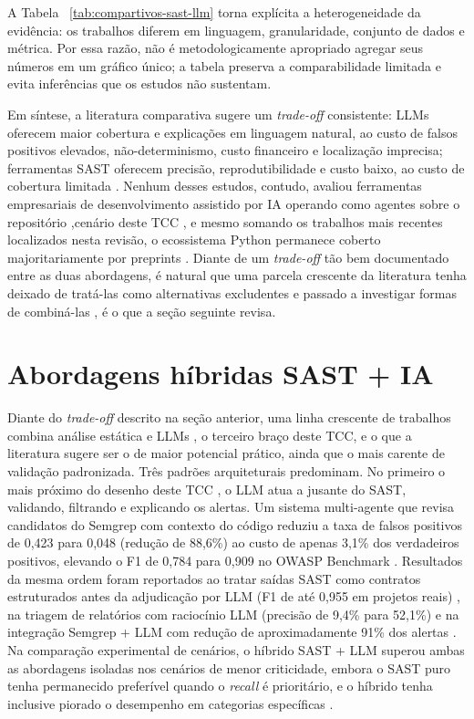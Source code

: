 A Tabela ~\ref{tab:compartivos-sast-llm} torna explícita a heterogeneidade da evidência: os trabalhos diferem em linguagem, granularidade, conjunto de dados e métrica. Por essa razão, não é metodologicamente apropriado agregar seus números em um gráfico único; a tabela preserva a comparabilidade limitada e evita inferências que os estudos não sustentam.

Em síntese, a literatura comparativa sugere um \textit{trade-off} consistente: LLMs oferecem maior cobertura e explicações em linguagem natural, ao custo de falsos positivos elevados, não-determinismo, custo financeiro e localização imprecisa; ferramentas SAST oferecem precisão, reprodutibilidade e custo baixo, ao custo de cobertura limitada \cite{Ozturk2023AIvsSAST, Tamberg2025LLMHarness, Gnieciak2025LLMvsSAST}. Nenhum desses estudos, contudo, avaliou ferramentas empresariais de desenvolvimento assistido por IA operando como agentes sobre o repositório ,cenário deste TCC , e mesmo somando os trabalhos mais recentes localizados nesta revisão, o ecossistema Python permanece coberto majoritariamente por preprints \cite{Pellew2026RealVuln, Farasat2025PythonSecurity, Zhou2024SASTLLMRepo, Adnan2026ALPHA}. Diante de um \textit{trade-off} tão bem documentado entre as duas abordagens, é natural que uma parcela crescente da literatura tenha deixado de tratá-las como alternativas excludentes e passado a investigar formas de combiná-las , é o que a seção seguinte revisa.




\section{Abordagens híbridas SAST + IA}\label{sec:abordagens-hibridas}
Diante do \textit{trade-off} descrito na seção anterior, uma linha crescente de trabalhos combina análise estática e LLMs , o terceiro braço deste TCC, e o que a literatura sugere ser o de maior potencial prático, ainda que o mais carente de validação padronizada. Três padrões arquiteturais predominam. No primeiro o mais próximo do desenho deste TCC , o LLM atua a jusante do SAST, validando, filtrando e explicando os alertas. Um sistema multi-agente que revisa candidatos do Semgrep com contexto do código reduziu a taxa de falsos positivos de 0,423 para 0,048 (redução de 88,6\%) ao custo de apenas 3,1\% dos verdadeiros positivos, elevando o F1 de 0,784 para 0,909 no OWASP Benchmark \cite{Ameen2026QASecClaw}. Resultados da mesma ordem foram reportados ao tratar saídas SAST como contratos estruturados antes da adjudicação por LLM (F1 de até 0,955 em projetos reais) \cite{Iranmanesh2025ZeroFalse}, na triagem de relatórios com raciocínio LLM (precisão de 9,4\% para 52,1\%) \cite{Li2025SASTReportsLLM} e na integração Semgrep + LLM com redução de aproximadamente 91\% dos alertas \cite{Agrawal2025SASTGenius}. Na comparação experimental de cenários, o híbrido SAST + LLM superou ambas as abordagens isoladas nos cenários de menor criticidade, embora o SAST puro tenha permanecido preferível quando o \textit{recall} é prioritário, e o híbrido tenha inclusive piorado o desempenho em categorias específicas \cite{Ciavatta2026LLMSAST}.

